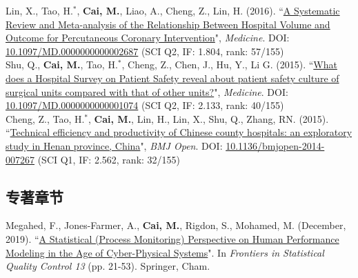 \documentclass[11pt, a4paper]{article}
\newcommand{\years}[1]{\marginnote{\scriptsize #1}}
\begin{document}
\years{2016}Lin, X., Tao, H.$^\ast$, \textbf{Cai, M.}, Liao, A., Cheng, Z., Lin, H. (2016). ``\ul{A Systematic Review and Meta-analysis of the Relationship Between Hospital Volume and Outcome for Percutaneous Coronary Intervention}", \emph{Medicine}. DOI: \href{https://doi.org/10.1097/MD.0000000000002687}{10.1097/MD.0000000000002687} (SCI Q2, IF: 1.804, rank: 57/155)\\
\years{2015}Shu, Q., \textbf{Cai, M.}, Tao, H.$^\ast$, Cheng, Z., Chen, J., Hu, Y., Li G. (2015). ``\ul{What does a Hospital Survey on Patient Safety reveal about patient safety culture of surgical units compared with that of other units?}", \emph{Medicine}. DOI: \href{https://doi.org/10.1097/MD.0000000000001074}{10.1097/MD.0000000000001074} (SCI Q2, IF: 2.133, rank: 40/155)\\
\years{2015}Cheng, Z., Tao, H.$^\ast$, \textbf{Cai, M.}, Lin, H., Lin, X., Shu, Q., Zhang, RN. (2015). ``\ul{Technical efficiency and productivity of Chinese county hospitals: an exploratory study in Henan province, China}", \emph{BMJ Open}. DOI: \href{https://doi.org/10.1136/bmjopen-2014-007267}{10.1136/bmjopen-2014-007267} (SCI Q1, IF: 2.562, rank: 32/155)

\subsection*{专著章节}
\years{2019}Megahed, F., Jones-Farmer, A., \textbf{Cai, M.}, Rigdon, S., Mohamed, M. (December, 2019). ``\ul{A Statistical (Process Monitoring) Perspective on Human Performance Modeling in the Age of Cyber-Physical Systems}". In \textit{Frontiers in Statistical Quality Control 13} (pp. 21-53). Springer, Cham.
\end{document}
